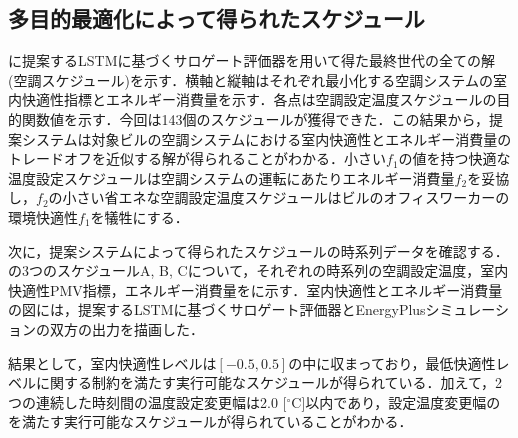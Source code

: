 \subsection{多目的最適化によって得られたスケジュール}
に提案するLSTMに基づくサロゲート評価器を用いて得た最終世代の全ての解(空調スケジュール)を示す．横軸と縦軸はそれぞれ最小化する空調システムの室内快適性指標とエネルギー消費量を示す．各点は空調設定温度スケジュールの目的関数値を示す．今回は143個のスケジュールが獲得できた．この結果から，提案システムは対象ビルの空調システムにおける室内快適性とエネルギー消費量のトレードオフを近似する解が得られることがわかる．小さい$f_1$の値を持つ快適な温度設定スケジュールは空調システムの運転にあたりエネルギー消費量$f_2$を妥協し，$f_2$の小さい省エネな空調設定温度スケジュールはビルのオフィスワーカーの環境快適性$f_1$を犠牲にする．

次に，提案システムによって得られたスケジュールの時系列データを確認する．の3つのスケジュールA, B, Cについて，それぞれの時系列の空調設定温度，室内快適性PMV指標，エネルギー消費量をに示す．室内快適性とエネルギー消費量の図には，提案するLSTMに基づくサロゲート評価器とEnergyPlusシミュレーションの双方の出力を描画した．

結果として，室内快適性レベルは$[-0.5, 0.5]$の中に収まっており，最低快適性レベルに関する制約を満たす実行可能なスケジュールが得られている．加えて，2つの連続した時刻間の温度設定変更幅は2.0 [$^\circ$C]以内であり，設定温度変更幅のを満たす実行可能なスケジュールが得られていることがわかる．

